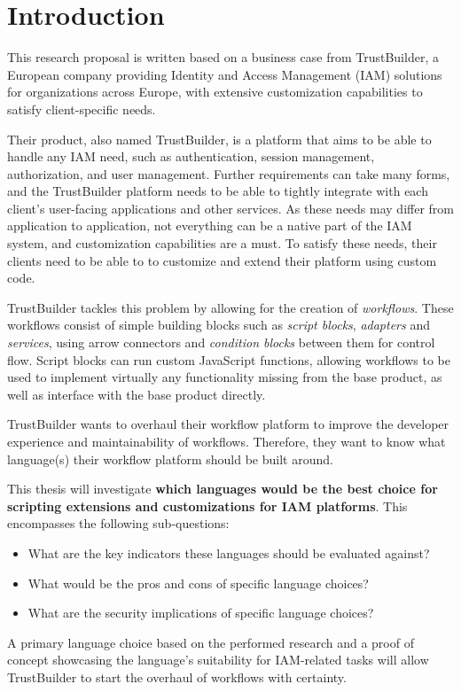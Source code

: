 
\section{Introduction}%
\label{sec:introduction}

This research proposal is written based on a business case from TrustBuilder, a European company providing Identity and Access Management (IAM) solutions for organizations across Europe, with extensive customization capabilities to satisfy client-specific needs.

Their product, also named TrustBuilder, is a platform that aims to be able to handle any IAM need, such as authentication, session management, authorization, and user management. Further requirements can take many forms, and the TrustBuilder platform needs to be able to tightly integrate with each client’s user-facing applications and other services. As these needs may differ from application to application, not everything can be a native part of the IAM system, and customization capabilities are a must. To satisfy these needs, their clients need to be able to to customize and extend their platform using custom code.

TrustBuilder tackles this problem by allowing for the creation of \emph{workflows}. These workflows consist of simple building blocks such as \emph{script blocks}, \emph{adapters} and \emph{services}, using arrow connectors and \emph{condition blocks} between them for control flow. Script blocks can run custom JavaScript functions, allowing workflows to be used to implement virtually any functionality missing from the base product, as well as interface with the base product directly.

TrustBuilder wants to overhaul their workflow platform to improve the developer experience and maintainability of workflows. Therefore, they want to know what language(s) their workflow platform should be built around.

This thesis will investigate \textbf{which languages would be the best choice for scripting extensions and customizations for IAM platforms}. This encompasses the following sub-questions: 
\begin{itemize}
  \item{What are the key indicators these languages should be evaluated against?}
  \item{What would be the pros and cons of specific language choices?}
  \item{What are the security implications of specific language choices?}
\end{itemize}
A primary language choice based on the performed research and a proof of concept showcasing the language’s suitability for IAM-related tasks will allow TrustBuilder to start the overhaul of workflows with certainty.

